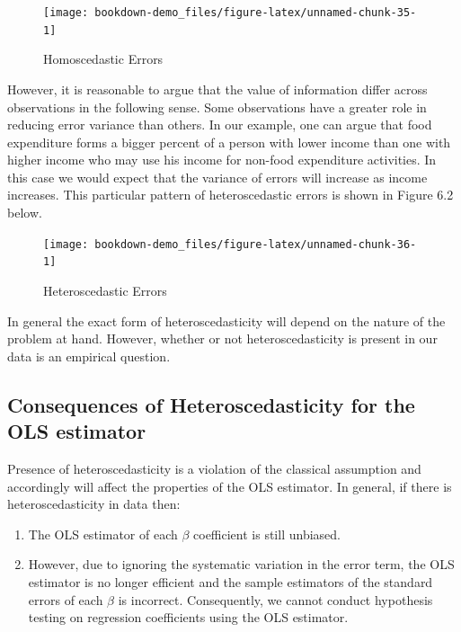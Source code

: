\documentclass[
]{book}
\theoremstyle{definition}
\theoremstyle{definition}
\theoremstyle{definition}
\theoremstyle{definition}
\theoremstyle{remark}
\begin{document}
\begin{figure}

{\centering \texttt{[image: bookdown-demo\_files/figure-latex/unnamed-chunk-35-1]} 

}

\caption{Homoscedastic Errors}\label{fig:unnamed-chunk-35}
\end{figure}

However, it is reasonable to argue that the value of information differ across observations in the following sense. Some observations have a greater role in reducing error variance than others. In our example, one can argue that food expenditure forms a bigger percent of a person with lower income than one with higher income who may use his income for non-food expenditure activities. In this case we would expect that the variance of errors will increase as income increases. This particular pattern of heteroscedastic errors is shown in Figure 6.2 below.

\begin{figure}

{\centering \texttt{[image: bookdown-demo\_files/figure-latex/unnamed-chunk-36-1]} 

}

\caption{Heteroscedastic Errors}\label{fig:unnamed-chunk-36}
\end{figure}

In general the exact form of heteroscedasticity will depend on the nature of the problem at hand. However, whether or not heteroscedasticity is present in our data is an empirical question.

\hypertarget{consequences-of-heteroscedasticity-for-the-ols-estimator}{%
\subsection{Consequences of Heteroscedasticity for the OLS estimator}\label{consequences-of-heteroscedasticity-for-the-ols-estimator}}

Presence of heteroscedasticity is a violation of the classical assumption and accordingly will affect the properties of the OLS estimator. In general, if there is heteroscedasticity in data then:

\begin{enumerate}
\def\labelenumi{\arabic{enumi}.}
\item
  The OLS estimator of each \(\beta\) coefficient is still unbiased.
\item
  However, due to ignoring the systematic variation in the error term, the OLS estimator is no longer efficient and the sample estimators of the standard errors of each \(\beta\) is incorrect. Consequently, we cannot conduct hypothesis testing on regression coefficients using the OLS estimator.
\end{enumerate}
\end{document}
